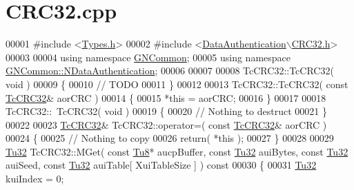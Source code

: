 \hypertarget{_c_r_c32_8cpp_source}{}\section{C\+R\+C32.\+cpp}
\label{_c_r_c32_8cpp_source}

\begin{DoxyCode}
00001 \textcolor{preprocessor}{#include <\mbox{\hyperlink{_types_8h}{Types.h}}>}
00002 \textcolor{preprocessor}{#include <\mbox{\hyperlink{_c_r_c32_8h}{DataAuthentication\(\backslash\)CRC32.h}}>}
00003 
00004 \textcolor{keyword}{using namespace }\mbox{\hyperlink{namespace_g_n_common}{GNCommon}};
00005 \textcolor{keyword}{using namespace }\mbox{\hyperlink{namespace_g_n_common_1_1_n_data_authentication}{GNCommon::NDataAuthentication}};
00006 
00007 
00008 TcCRC32::TcCRC32( \textcolor{keywordtype}{void} )
00009 \{
00010    \textcolor{comment}{// TODO}
00011 \}
00012 
00013 TcCRC32::TcCRC32( \textcolor{keyword}{const} \mbox{\hyperlink{class_g_n_common_1_1_n_data_authentication_1_1_tc_c_r_c32}{TcCRC32}}& aorCRC )
00014 \{
00015    *\textcolor{keyword}{this} = aorCRC;
00016 \}
00017 
00018 TcCRC32::~TcCRC32( \textcolor{keywordtype}{void} )
00019 \{
00020    \textcolor{comment}{// Nothing to destruct}
00021 \}
00022 
00023 \mbox{\hyperlink{class_g_n_common_1_1_n_data_authentication_1_1_tc_c_r_c32}{TcCRC32}}& TcCRC32::operator=( \textcolor{keyword}{const} \mbox{\hyperlink{class_g_n_common_1_1_n_data_authentication_1_1_tc_c_r_c32}{TcCRC32}}& aorCRC )
00024 \{
00025    \textcolor{comment}{// Nothing to copy}
00026    \textcolor{keywordflow}{return}( *\textcolor{keyword}{this} );
00027 \}
00028 
00029 \mbox{\hyperlink{namespace_g_n_common_a941b527ef318f318aed7903dc832b7e4}{Tu32}} TcCRC32::MGet( \textcolor{keyword}{const} \mbox{\hyperlink{namespace_g_n_common_a7939e251ddbf5d3a31832dcfdc8bde39}{Tu8}}* aucpBuffer, \textcolor{keyword}{const} \mbox{\hyperlink{namespace_g_n_common_a941b527ef318f318aed7903dc832b7e4}{Tu32}} auiBytes, \textcolor{keyword}{const} 
      \mbox{\hyperlink{namespace_g_n_common_a941b527ef318f318aed7903dc832b7e4}{Tu32}} auiSeed, \textcolor{keyword}{const} \mbox{\hyperlink{namespace_g_n_common_a941b527ef318f318aed7903dc832b7e4}{Tu32}} auiTable[ XuiTableSize ] )\textcolor{keyword}{ const}
00030 \textcolor{keyword}{}\{
00031    \mbox{\hyperlink{namespace_g_n_common_a941b527ef318f318aed7903dc832b7e4}{Tu32}}       kuiIndex = 0;

\end{DoxyCode}
